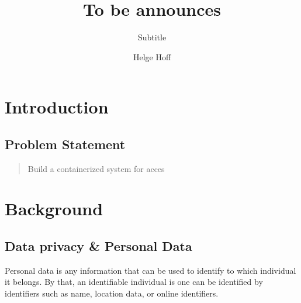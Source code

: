 \documentclass[USenglish]{uit-thesis}
\begin{document}

\title{To be announces}
\subtitle{Subtitle}			%
\author{Helge Hoff}

\maketitle

\frontmatter

\begin{epigraph}
\end{epigraph}

\begin{abstract}
\lipsum[2-3]
\end{abstract}

\begin{acknowledgement}
\lipsum[4-8]
\end{acknowledgement}

\tableofcontents

\listofdefinition

\mainmatter

\chapter{Introduction}

\section{Problem Statement}


\begin{quote}
    Build a containerized system for acces
\end{quote}

\chapter{Background}
\section{Data privacy \& Personal Data}
Personal data is any information that can be used to identify to which individual it belongs.
By that, an identifiable individual is one can be identified by identifiers such as name,
location data, or online identifiers.
\end{document}
